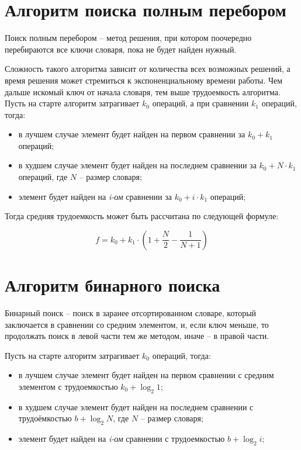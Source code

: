 \documentclass[a4paper,14pt, unknownkeysallowed]{extreport}
\begin{document}
\section{Алгоритм поиска полным перебором}

Поиск полным перебором -- метод решения, при котором поочередно перебираются все ключи словаря, пока не будет найден нужный.

Сложность такого алгоритма зависит от количества всех возможных решений, а время решения может стремиться к экспоненциальному времени работы.
Чем дальше искомый ключ от начала словаря, тем выше трудоемкость алгоритма. Пусть на старте алгоритм затрагивает $k_0$ операций, а при сравнении $k_1$ операций, тогда:
\begin{itemize}
	\item в лучшем случае элемент будет найден на первом сравнении за $k_0 + k_1$ операций;
	\item в худшем случае элемент будет найден на последнем сравнении за $k_0 +  N \cdot k_1$ операций, где $N$ -- размер словаря;
	\item элемент будет найден на \textit{i-ом} сравнении за $k_0 + i \cdot k_1$ операций;
\end{itemize}

Тогда средняя трудоемкость может быть рассчитана по следующей формуле:

\begin{equation}
	f = k_0 + k_1 \cdot \left(1 + \frac{N}{2} - \frac{1}{N + 1}\right)
\end{equation}

\section{Алгоритм бинарного поиска}


Бинарный поиск -- поиск в заранее отсортированном словаре, который заключается в сравнении со средним элементом, и, если ключ меньше, то продолжать поиск в левой части тем же методом, иначе -- в правой части.

Пусть на старте алгоритм затрагивает $k_0$ операций, тогда:
\begin{itemize}
	\item в лучшем случае элемент будет найден на первом сравнении с средним элементом с трудоемкостью $k_0 + \log_2 1$;
	\item в худшем случае элемент будет найден на последнем сравнении с трудоёмкостью $b +  \log_2 N$, где $N$ -- размер словаря;
	\item элемент будет найден на \textit{i-ом} сравнении с трудоемкостью $b + \log_2 i$;
\end{itemize}
\end{document}
